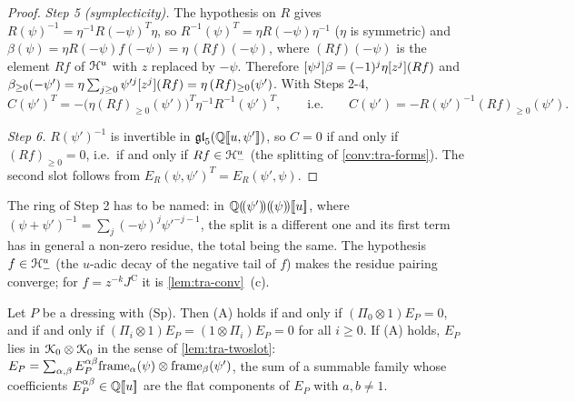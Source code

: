 \begin{proof}
\emph{Step 5 (symplecticity).} The hypothesis on $R$ gives $R(\psi)^{-1} = \eta^{-1}R(-\psi)^T\eta$, so $R^{-1}(\psi)^T = \eta R(-\psi)\eta^{-1}$ ($\eta$ is symmetric) and $\beta(\psi) = \eta R(-\psi)f(-\psi) = \eta\,(Rf)(-\psi)$, where $(Rf)(-\psi)$ is the element $Rf$ of $\mathcal{H}^u$ with $z$ replaced by $-\psi$. Therefore $[\psi^j]\beta = (-1)^j\eta[z^j](Rf)$ and $\beta_{\geq 0}(-\psi') = \eta\sum_{j\geq 0}\psi'^j[z^j](Rf) = \eta\,(Rf)_{\geq 0}(\psi')$. With Steps 2-4,
\[
C(\psi')^T = -\bigl(\eta(Rf)_{\geq 0}(\psi')\bigr)^T\eta^{-1}R^{-1}(\psi')^T,\qquad\text{i.e.}\qquad C(\psi') = -R(\psi')^{-1}(Rf)_{\geq 0}(\psi').
\]

\emph{Step 6.} $R(\psi')^{-1}$ is invertible in $\mathfrak{gl}_5(\mathbb{Q}[\![ u,\psi' ]\!])$, so $C = 0$ if and only if $(Rf)_{\geq 0} = 0$, i.e.\ if and only if $Rf\in\mathcal{H}^u_-$ (the splitting of \cref{conv:tra-forms}). The second slot follows from $E_R(\psi,\psi')^T = E_R(\psi',\psi)$.
\end{proof}

The ring of Step 2 has to be named: in $\mathbb{Q}(\!(\psi')\!)(\!(\psi)\!)[\![ u ]\!]$, where $(\psi+\psi')^{-1} = \sum_j(-\psi)^j\psi'^{-j-1}$, the split is a different one and its first term has in general a non-zero residue, the total being the same. The hypothesis $f\in\mathcal{H}^u_-$ (the $u$-adic decay of the negative tail of $f$) makes the residue pairing converge; for $f = z^{-k}J^{\mathrm C}$ it is \cref{lem:tra-conv}~(c).

\begin{cor}
\label{cor:tra-edges}
Let $P$ be a dressing with (Sp). Then (A) holds if and only if $(\Pi_0\otimes 1)E_P = 0$, and if and only if $(\Pi_i\otimes 1)E_P = (1\otimes\Pi_i)E_P = 0$ for all $i\geq 0$. If (A) holds, $E_P$ lies in $\mathcal{K}_{0}\otimes\mathcal{K}_{0}$ in the sense of \cref{lem:tra-twoslot}: $E_P = \sum_{\alpha,\beta}E_P^{\alpha\beta}\mathrm{frame}_\alpha(\psi)\otimes\mathrm{frame}_\beta(\psi')$, the sum of a summable family whose coefficients $E_P^{\alpha\beta}\in\mathbb{Q}[\![ u ]\!]$ are the flat components of $E_P$ with $a,b\neq 1$.
\end{cor}

